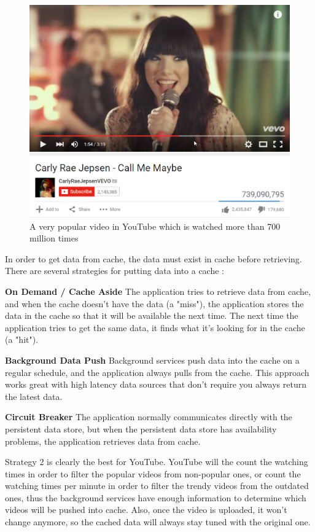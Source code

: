 \begin{figure}[H]
	\centering
	\includegraphics[width=\linewidth]{CallMeMaybe.png}
	\caption{A very popular video in YouTube which is watched more than 700 million times}
\end{figure}

In order to get data from cache, the data must exist in cache before retrieving. There are several strategies for putting data into a cache \cite{azure:distributed}:

\textbf{On Demand / Cache Aside} The application tries to retrieve data from cache, and when the cache doesn't have the data (a "miss"), the application stores the data in the cache so that it will be available the next time. The next time the application tries to get the same data, it finds what it's looking for in the cache (a "hit").

\textbf{Background Data Push} Background services push data into the cache on a regular schedule, and the application always pulls from the cache. This approach works great with high latency data sources that don't require you always return the latest data.

\textbf{Circuit Breaker} The application normally communicates directly with the persistent data store, but when the persistent data store has availability problems, the application retrieves data from cache.

Strategy 2 is clearly the best for YouTube. YouTube will the count the watching times in order to filter the popular videos from non-popular ones, or count the watching times per minute in order to filter the trendy videos from the outdated ones, thus the background services have enough information to determine which videos will be pushed into cache. Also, once the video is uploaded, it won't change anymore, so the cached data will always stay tuned with the original one.

